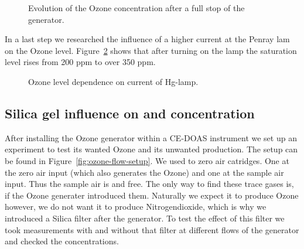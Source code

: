\begin{figure}[htbp]
  \centering
  \caption{Evolution of the Ozone concentration after a full stop of the
    generator.}
  \label{fig:multiple-stop}
\end{figure}

In a last step we researched the influence of a higher current at the
Penray lam on the Ozone level. Figure~\ref{fig:lamp} shows that after
turning on the lamp the saturation level rises from 200 ppm to over
350 ppm.

\begin{figure}[htbp]
  \centering
  \caption{Ozone level dependence on current of Hg-lamp.}
  \label{fig:lamp}
\end{figure}

\subsection{Silica gel influence on  and  concentration}
\label{sec:silica}

After installing the Ozone generator within a CE-DOAS instrument we
set up an experiment to test its wanted Ozone and its unwanted
 production. The setup can be found in
Figure~\ref{fig:ozone-flow-setup}. We used to zero air catridges. One
at the zero air input (which also generates the Ozone) and one at the
sample air input. Thus the sample air is  and 
free. The only way to find these trace gases is, if the Ozone
generater introduced them. Naturally we expect it to produce Ozone
however, we do not want it to produce Nitrogendioxide, which is why we
introduced a Silica filter after the generator. To test the effect of
this filter we took measurements with and without that filter at
different flows of the generator and checked the concentrations.

